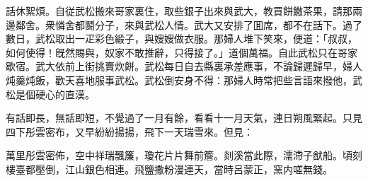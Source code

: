 話休絮煩。自従武松搬來哥家裏住，取些銀子出來與武大，教買餅饊茶果，請那兩邊鄰舍。衆憐舍都鬬分子，來與武松人情。武大又安排了囬席，都不在話下。過了數日，武松取出一疋彩色緞子，與嫂嫂做衣服。那婦人堆下笑來，便道：「叔叔，如何使得！旣然賜與，奴家不敢推辭，只得接了。」道個萬福。自此武松只在哥家歇宿。武大依前上街挑賣炊餅。武松每日自去縣裏承差應事，不論歸遲歸早，婦人炖羹炖飯，歡天喜地服事武松。武松倒安身不得：那婦人時常把些言語來撥他，武松是個硬心的直漢。

有話即長，無話即短，不覺過了一月有餘，看看十一月天氣，連日朔風緊起。只見四下彤雲密布，又早紛紛揚揚，飛下一天瑞雪來。但見：　

\begin{myquote}
萬里彤雲密佈，空中祥瑞飄簾，瓊花片片舞前簷。剡溪當此際，濡滯子猷船。頃刻樓臺都壓倒，江山銀色相連。飛鹽撒粉漫連天，當時呂蒙正，窯内嗟無錢。
\end{myquote}

